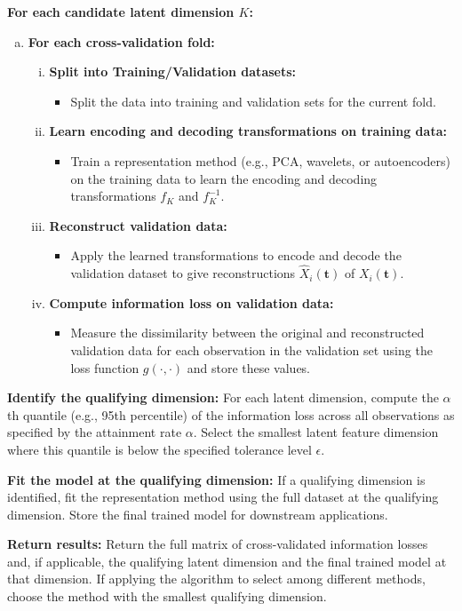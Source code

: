 \begin{algorithm}
\begin{algorithmic}[1]
\State \textbf{For each candidate latent dimension $K$:}
\begin{enumerate}[a.]
    \item \textbf{For each cross-validation fold:}
    \begin{enumerate}[i.]
        \item \textbf{Split into Training/Validation datasets:}
        \begin{itemize}
            \item Split the data into training and validation sets for the current fold.
        \end{itemize}
        \item \textbf{Learn encoding and decoding transformations on training data:}
        \begin{itemize}
            \item Train a representation method (e.g., PCA, wavelets, or autoencoders) on the training data to learn the encoding and decoding transformations $f_K$ and $f^{-1}_K$.
        \end{itemize}
        \item \textbf{Reconstruct validation data:}
        \begin{itemize}
            \item Apply the learned transformations to encode and decode the validation dataset to give reconstructions $\widehat{X}_i (\mathbf{t})$ of $X_i (\mathbf{t})$.
        \end{itemize}
        \item \textbf{Compute information loss on validation data:}
        \begin{itemize}
            \item Measure the dissimilarity between the original and reconstructed validation data for each observation in the validation set using the loss function $g(\cdot, \cdot)$ and store these values.
        \end{itemize}
    \end{enumerate}
\end{enumerate}

\State \textbf{Identify the qualifying dimension:} For each latent dimension, compute the $\alpha$th quantile (e.g., 95th percentile) of the information loss across all observations as specified by the attainment rate $\alpha$. Select the smallest latent feature dimension where this quantile is below the specified tolerance level $\epsilon$.

\State \textbf{Fit the model at the qualifying dimension:} If a qualifying dimension is identified, fit the representation method using the full dataset at the qualifying dimension. Store the final trained model for downstream applications.

\State \textbf{Return results:} Return the full matrix of cross-validated information losses and, if applicable, the qualifying latent dimension and the final trained model at that dimension. If applying the algorithm to select among different methods, choose the method with the smallest qualifying dimension.

\end{algorithmic}
\end{algorithm}


